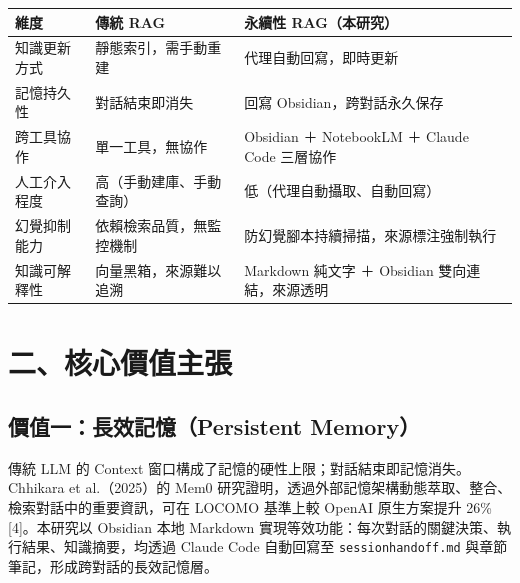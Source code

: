 {\def\LTcaptype{none} %
\begin{longtable}[]{@{}
  >{\raggedright\arraybackslash}p{}
  >{\raggedright\arraybackslash}p{}
  >{\raggedright\arraybackslash}p{}@{}}
\toprule\noalign{}
\begin{minipage}[b]{\linewidth}\raggedright
維度
\end{minipage} & \begin{minipage}[b]{\linewidth}\raggedright
傳統 RAG
\end{minipage} & \begin{minipage}[b]{\linewidth}\raggedright
永續性 RAG（本研究）
\end{minipage} \\
\midrule\noalign{}
\endhead
\bottomrule\noalign{}
\endlastfoot
知識更新方式 & 靜態索引，需手動重建 & 代理自動回寫，即時更新 \\
記憶持久性 & 對話結束即消失 & 回寫 Obsidian，跨對話永久保存 \\
跨工具協作 & 單一工具，無協作 & Obsidian ＋ NotebookLM ＋ Claude Code
三層協作 \\
人工介入程度 & 高（手動建庫、手動查詢） &
低（代理自動攝取、自動回寫） \\
幻覺抑制能力 & 依賴檢索品質，無監控機制 &
防幻覺腳本持續掃描，來源標注強制執行 \\
知識可解釋性 & 向量黑箱，來源難以追溯 & Markdown 純文字 ＋ Obsidian
雙向連結，來源透明 \\
\end{longtable}
}

\section{二、核心價值主張}\label{ux4e8cux6838ux5fc3ux50f9ux503cux4e3bux5f35}

\subsection{價值一：長效記憶（Persistent
Memory）}\label{ux50f9ux503cux4e00ux9577ux6548ux8a18ux61b6persistent-memory}

傳統 LLM 的 Context
窗口構成了記憶的硬性上限；對話結束即記憶消失。Chhikara et al.（2025）的
Mem0
研究證明，透過外部記憶架構動態萃取、整合、檢索對話中的重要資訊，可在
LOCOMO 基準上較 OpenAI 原生方案提升 26\% {[}4{]}。本研究以 Obsidian 本地
Markdown 實現等效功能：每次對話的關鍵決策、執行結果、知識摘要，均透過
Claude Code 自動回寫至 \texttt{sessionhandoff.md}
與章節筆記，形成跨對話的長效記憶層。

